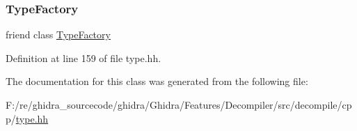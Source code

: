 \subsubsection{\texorpdfstring{TypeFactory}{TypeFactory}}
{\footnotesize\ttfamily friend class \mbox{\hyperlink{class_type_factory}{Type\+Factory}}\hspace{0.3cm}{\ttfamily [friend]}}



Definition at line 159 of file type.\+hh.



The documentation for this class was generated from the following file\+:\begin{DoxyCompactItemize}
\item 
F\+:/re/ghidra\+\_\+sourcecode/ghidra/\+Ghidra/\+Features/\+Decompiler/src/decompile/cpp/\mbox{\hyperlink{type_8hh}{type.\+hh}}\end{DoxyCompactItemize}
